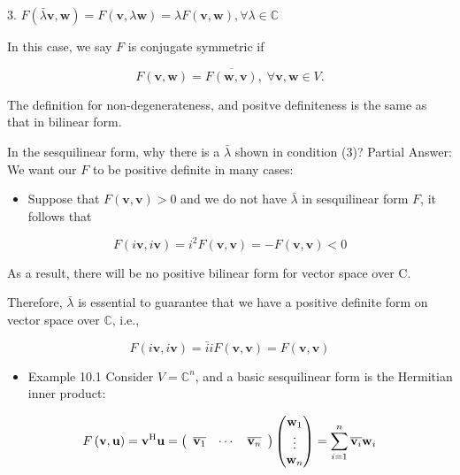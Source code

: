 \documentclass[11pt]{article}
\begin{document}
3. \(F\left( {\bar{\lambda }\mathbf{v},\mathbf{w}}\right)  = F\left( {\mathbf{v},\lambda \mathbf{w}}\right)  = {\lambda F}\left( {\mathbf{v},\mathbf{w}}\right) ,\forall \lambda  \in  \mathbb{C}\)

In this case, we say \(F\) is conjugate symmetric if

\[
F\left( {\mathbf{v},\mathbf{w}}\right)  = \overline{F\left( {\mathbf{w},\mathbf{v}}\right) },\;\forall \mathbf{v},\mathbf{w} \in  V.
\]

The definition for non-degenerateness, and positve definiteness is the same as that in bilinear form.

In the sesquilinear form, why there is a \(\bar{\lambda }\) shown in condition (3)? Partial Answer: We want our \(F\) to be positive definite in many cases:

\begin{itemize}
\item Suppose that \(F\left( {\mathbf{v},\mathbf{v}}\right)  > 0\) and we do not have \(\bar{\lambda }\) in sesquilinear form \(F\), it follows that
\end{itemize}

\[
F\left( {i\mathbf{v},i\mathbf{v}}\right)  = {i}^2F\left( {\mathbf{v},\mathbf{v}}\right)  =  - F\left( {\mathbf{v},\mathbf{v}}\right)  < 0
\]

As a result, there will be no positive bilinear form for vector space over C.

Therefore, \(\bar{\lambda }\) is essential to guarantee that we have a positive definite form on vector space over \(\mathbb{C}\), i.e.,

\[
F\left( {i\mathbf{v},i\mathbf{v}}\right)  = \bar{i}{iF}\left( {\mathbf{v},\mathbf{v}}\right)  = F\left( {\mathbf{v},\mathbf{v}}\right)
\]

\begin{itemize}
\item Example 10.1 Consider \(V = {\mathbb{C}}^n\), and a basic sesquilinear form is the Hermitian inner product:
\end{itemize}

\[
F\left( {\mathbf{v},\mathbf{u}}\right)  = {\bf v}^{\mathrm{H}}\mathbf{u} = \left( \begin{array}{lll} \overline{{\bf v}_1} & \cdots & \overline{{\bf v}_n} \end{array}\right) \left( \begin{matrix} {\bf w}_1 \\  \vdots \\  {\bf w}_n \end{matrix}\right)  = \mathop{\sum }\limits_{{i = 1}}^n\overline{{\bf v}_{i}}{\bf w}_{i}
\]
\end{document}
